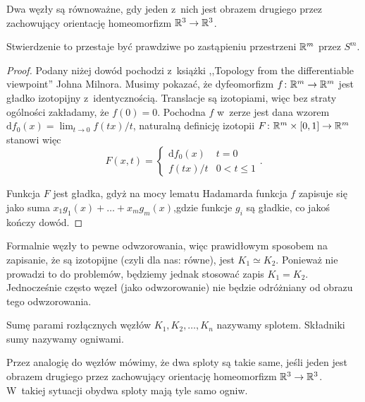 \begin{proposition}
    \label{equivalent_knots_2}
    Dwa węzły są równoważne, gdy jeden z~nich jest obrazem drugiego przez zachowujący orientację homeomorfizm $\mathbb R^3 \to \mathbb R^3$.
\end{proposition}

Stwierdzenie to przestaje być prawdziwe po zastąpieniu przestrzeni $\mathbb R^m$ przez $S^m$.

\begin{proof}
    Podany niżej dowód pochodzi z~książki ,,Topology from the differentiable viewpoint'' Johna Milnora.
    Musimy pokazać, że dyfeomorfizm $f \colon \mathbb R^m \to \mathbb R^m$ jest gładko izotopijny z~identycznością.
    Translacje są izotopiami, więc bez straty ogólności zakładamy, że $f(0) = 0$.
    Pochodna $f$ w~zerze jest dana wzorem $\mathrm{d}f_0(x) = \lim_{t \to 0} f(tx) /t$,
    naturalną definicję izotopii $F \colon \mathbb R^m \times [0, 1] \to \mathbb R^m$ stanowi więc
    \[
        F(x, t) = \begin{cases}
            \mathrm{d}f_0(x) & t = 0 \\
            f(tx) / t & 0 < t \le 1
        \end{cases} .
    \]

    Funkcja $F$ jest gładka, gdyż na mocy lematu Hadamarda funkcja $f$ zapisuje się jako suma $x_1 g_1(x) + \ldots + x_mg_m(x)$,gdzie funkcje $g_i$ są gładkie, co jakoś kończy dowód.
\end{proof}

Formalnie węzły to pewne odwzorowania, więc prawidłowym sposobem na zapisanie, że są izotopijne (czyli dla nas: równe), jest $K_1 \simeq K_2$.
Ponieważ nie prowadzi to do problemów, będziemy jednak stosować zapis $K_1 = K_2$.
Jednocześnie często węzeł (jako odwzorowanie) nie będzie odróżniany od obrazu tego odwzorowania.

\begin{definition}
    \label{def_link}
    Sumę parami rozłącznych węzłów $K_1, K_2, \ldots, K_n$ nazywamy splotem.
    Składniki sumy nazywamy ogniwami.
\end{definition}

Przez analogię do węzłów mówimy, że dwa sploty są takie same, jeśli jeden jest obrazem drugiego przez zachowujący orientację homeomorfizm $\mathbb R^3 \to \mathbb R^3$.
W~takiej sytuacji obydwa sploty mają tyle samo ogniw.

